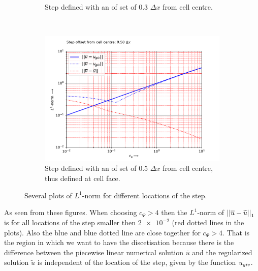 \begin{figure}[H]
\begin{subfigure}{0.49\textwidth}
    \caption{Step defined with an of set of  0.3 $\Delta x$ from cell centre.\label{fig:L1_norm_dx_offset_0.3dx}}
\end{subfigure}
\\
\begin{subfigure}{0.49\textwidth}
    \includegraphics[width=\textwidth]{figures/regul_1d_step_at=0.5_dx50.0.pdf}
    \caption{Step defined with an of set of  0.5 $\Delta x$ from cell centre, thus defined at cell face.\label{fig:L1_norm_dx_offset_0.5dx}}
\end{subfigure}
\caption{Several plots of $L^1$-norm for different locations of the step.}
\end{figure}

As seen from these figures.
When choosing  $c_{\Psi} > 4$ then the $L^1$-norm of $\left| |\overline{u} - \widetilde{u}| \right|_{1}$ is for all locations of the step smaller then $\num{2e-2}$ (red dotted lines in the plots).
Also the blue and blue dotted line are close together for $c_{\Psi}>4$.
That is the region in which we want to have the discetisation because there is the difference between the piecewise linear numerical solution $\overline{u}$ and the regularized solution $\widetilde{u}$ is independent of the location of the step, given by the function $u_{\it{giv}}$.

